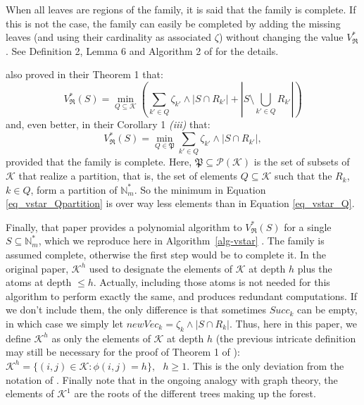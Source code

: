 \documentclass[
  11pt,
  a4paper,
]{article}
\theoremstyle{plain}
\theoremstyle{definition}
\theoremstyle{plain}
\theoremstyle{definition}
\theoremstyle{plain}
\theoremstyle{remark}
\begin{document}
When all leaves are regions of the family, it is said that the family is
complete. If this is not the case, the family can easily be completed by
adding the missing leaves (and using their cardinality as associated
\(\zeta\)) without changing the value \(V^*_{\mathfrak{R}}\). See
Definition 2, Lemma 6 and Algorithm 2 of \citet{MR4178188} for the
details.

\citet{MR4178188} also proved in their Theorem 1 that: \begin{equation}
V^*_{\mathfrak{R}}(S)=\min_{Q\subseteq\mathcal{K}}\left(\sum_{k'\in Q}\zeta_{k'}\wedge|S\cap R_{k'}|+\left| S\setminus\bigcup_{k'\in Q} R_{k'}   \right|\right)
\label{eq_vstar_Q} 
\end{equation} and, even better, in their Corollary 1 \emph{(iii)} that:
\begin{equation}
V^*_{\mathfrak{R}}(S) = \min_{Q\in \mathfrak P}\sum_{k'\in Q}\zeta_{k'}\wedge|S\cap R_{k'}|,
\label{eq_vstar_Qpartition}
\end{equation} provided that the family is complete. Here,
\(\mathfrak P \subseteq \mathcal P(\mathcal{K})\) is the set of subsets
of \(\mathcal{K}\) that realize a partition, that is, the set of
elements \(Q\subseteq\mathcal{K}\) such that the \(R_k\), \(k\in Q\),
form a partition of \(\mathbb{N}_m^*\). So the minimum in Equation
\eqref{eq_vstar_Qpartition} is over way less elements than in Equation
\eqref{eq_vstar_Q}.

Finally, that paper provides a polynomial algorithm to
\(V^*_{\mathfrak{R}}(S)\) for a single \(S\subseteq\mathbb{N}_m^*\),
which we reproduce here in  Algorithm~\ref{alg-vstar} . The family is
assumed complete, otherwise the first step would be to complete it. In
the original paper, \(\mathcal{K}^h\) used to designate the elements of
\(\mathcal{K}\) at depth \(h\) plus the atoms at depth \(\leq h\).
Actually, including those atoms is not needed for this algorithm to
perform exactly the same, and produces redundant computations. If we
don't include them, the only difference is that sometimes \(Succ_k\) can
be empty, in which case we simply let
\(newVec_k=\zeta_k\wedge|S\cap R_k|\). Thus, here in this paper, we
define \(\mathcal{K}^h\) as only the elements of \(\mathcal{K}\) at
depth \(h\) (the previous intricate definition may still be necessary
for the proof of Theorem 1 of \citet{MR4178188}):
\(\mathcal{K}^h=\{ (i,j)\in\mathcal{K}: \phi(i,j)=h      \}, \:\:\:h\geq 1.\)
This is the only deviation from the notation of \citet{MR4178188}.
Finally note that in the ongoing analogy with graph theory, the elements
of \(\mathcal{K}^1\) are the roots of the different trees making up the
forest.
\end{document}
